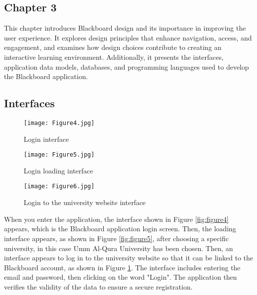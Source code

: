 \documentclass[a4paper,12pt]{article}
\begin{document}
\newpage 

\begin{center}
\vspace*{10cm} 
\section{Chapter 3}
\end{center}

\newpage

This chapter introduces Blackboard design and its importance in improving the
user experience. It explores design principles that enhance navigation, access, and engagement, and examines how design choices contribute to creating an interactive learning environment. Additionally, it presents the interfaces, application data models, databases, and programming languages used to develop the Blackboard application. 

\subsection{Interfaces}

\begin{figure}[h]
    \centering
    \begin{minipage}{0.30\textwidth} 
        \centering
        \texttt{[image: Figure4.jpg]} 
        \caption{Login interface}
        \label{fig:figure4}
    \end{minipage}\hfill
    \begin{minipage}{0.30\textwidth} 
        \centering
        \texttt{[image: Figure5.jpg]} 
        \caption{Login loading interface}
        \label{fig:figure5}
    \end{minipage} \hfill 
    \begin{minipage}{0.30\textwidth} 
        \centering
        \texttt{[image: Figure6.jpg]} 
        \caption{Login to the university website interface}
        \label{fig:figure6}
    \end{minipage}
\end{figure}
\vspace{0.5cm} 


When you enter the application, the interface shown in Figure \ref{fig:figure4} appears, which is
the Blackboard application login screen. Then, the loading interface appears, as shown in Figure \ref{fig:figure5}, after choosing a specific university, in this case Umm Al-Qura University has been chosen. Then, an interface appears to log in to the university website so that it can be linked to the Blackboard account, as shown in Figure \ref{fig:figure6}. The interface includes entering the email and password, then clicking on the word "Login". The application then verifies the validity of the data to ensure a secure registration. \newline
\end{document}
